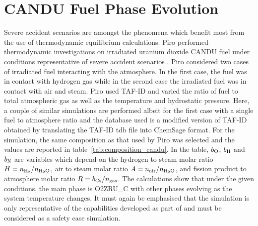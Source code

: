\section{CANDU Fuel Phase Evolution}
Severe accident scenarios are amongst the phenomena which benefit most from the use of thermodynamic equilibrium calculations. Piro performed thermodynamic investigations on irradiated uranium dioxide CANDU fuel under conditions representative of severe accident scenarios \cite{Piro:2022aa}. Piro considered two cases of irradiated fuel interacting with the atmosphere. In the first case, the fuel was in contact with hydrogen gas while in the second case the irradiated fuel was in contact with air and steam.  Piro used TAF-ID \cite{Gueneau15,Gueneau:2021aa} and varied the ratio of fuel to total atmospheric gas as well as the temperature and hydrostatic pressure. Here, a couple of similar simulations are performed albeit for the first case with a single fuel to atmosphere ratio and the database used is a modified version of TAF-ID obtained by translating the TAF-ID tdb file into ChemSage format. For the simulation, the same composition as that used by Piro was selected and the values are reported in table~\ref{tab:composition_candu}. In the table, $b_{\ce{O}}$, $b_{\ce{H}}$ and $b_{\ce{N}}$ are variables which depend on the hydrogen to steam molar ratio $H = n_{\ce{H2}} / n_{\ce{H2O}}$, air to steam molar ratio $A = n_{\text{air}} / n_{\ce{H2O}}$, and fission product to atmosphere molar ratio $R = b_{\ce{Cs}} / n_{\text{gas}}$. The calculations show that under the given conditions, the main phase is O2ZRU\_C with other phases evolving as the system temperature changes. It must again be emphasised that the simulation is only representative of the capabilities developed as part of {\GEM} and must be considered as a safety case simulation. 
